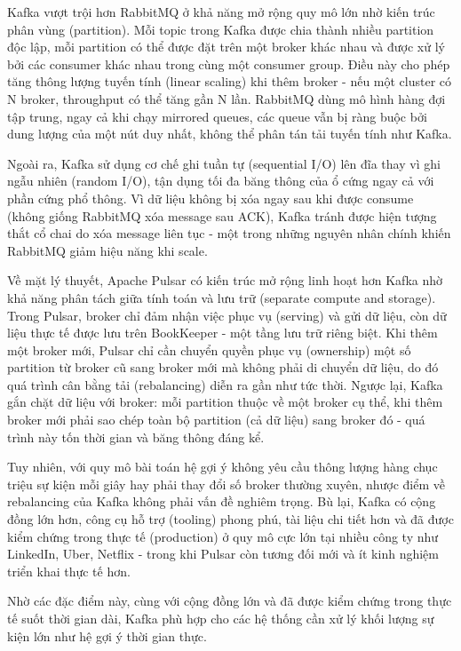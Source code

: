 \documentclass[../BTL.tex]{subfiles}
\begin{document}
Kafka vượt trội hơn RabbitMQ ở khả năng mở rộng quy mô lớn nhờ kiến trúc phân vùng (partition). Mỗi topic trong Kafka được chia thành nhiều partition độc lập, mỗi partition có thể được đặt trên một broker khác nhau và được xử lý bởi các consumer khác nhau trong cùng một consumer group. Điều này cho phép tăng thông lượng tuyến tính (linear scaling) khi thêm broker - nếu một cluster có N broker, throughput có thể tăng gần N lần. RabbitMQ dùng mô hình hàng đợi tập trung, ngay cả khi chạy mirrored queues, các queue vẫn bị ràng buộc bởi dung lượng của một nút duy nhất, không thể phân tán tải tuyến tính như Kafka.

Ngoài ra, Kafka sử dụng cơ chế ghi tuần tự (sequential I/O) lên đĩa thay vì ghi ngẫu nhiên (random I/O), tận dụng tối đa băng thông của ổ cứng ngay cả với phần cứng phổ thông. Vì dữ liệu không bị xóa ngay sau khi được consume (không giống RabbitMQ xóa message sau ACK), Kafka tránh được hiện tượng thắt cổ chai do xóa message liên tục - một trong những nguyên nhân chính khiến RabbitMQ giảm hiệu năng khi scale.

Về mặt lý thuyết, Apache Pulsar có kiến trúc mở rộng linh hoạt hơn Kafka nhờ khả năng phân tách giữa tính toán và lưu trữ (separate compute and storage). Trong Pulsar, broker chỉ đảm nhận việc phục vụ (serving) và gửi dữ liệu, còn dữ liệu thực tế được lưu trên BookKeeper - một tầng lưu trữ riêng biệt. Khi thêm một broker mới, Pulsar chỉ cần chuyển quyền phục vụ (ownership) một số partition từ broker cũ sang broker mới mà không phải di chuyển dữ liệu, do đó quá trình cân bằng tải (rebalancing) diễn ra gần như tức thời. Ngược lại, Kafka gắn chặt dữ liệu với broker: mỗi partition thuộc về một broker cụ thể, khi thêm broker mới phải sao chép toàn bộ partition (cả dữ liệu) sang broker đó - quá trình này tốn thời gian và băng thông đáng kể.

Tuy nhiên, với quy mô bài toán hệ gợi ý không yêu cầu thông lượng hàng chục triệu sự kiện mỗi giây hay phải thay đổi số broker thường xuyên, nhược điểm về rebalancing của Kafka không phải vấn đề nghiêm trọng. Bù lại, Kafka có cộng đồng lớn hơn, công cụ hỗ trợ (tooling) phong phú, tài liệu chi tiết hơn và đã được kiểm chứng trong thực tế (production) ở quy mô cực lớn tại nhiều công ty như LinkedIn, Uber, Netflix - trong khi Pulsar còn tương đối mới và ít kinh nghiệm triển khai thực tế hơn.

Nhờ các đặc điểm này, cùng với cộng đồng lớn và đã được kiểm chứng trong thực tế suốt thời gian dài, Kafka phù hợp cho các hệ thống cần xử lý khối lượng sự kiện lớn như hệ gợi ý thời gian thực.
\end{document}
